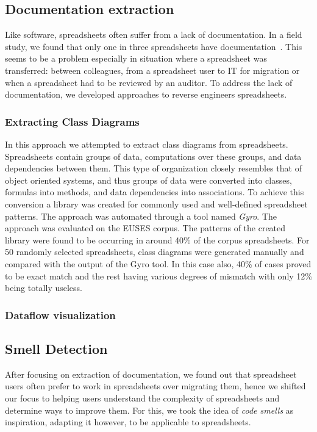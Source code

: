 \documentclass[conference]{IEEEtran}
\begin{document}
\subsection{Documentation extraction} 
Like software, spreadsheets often suffer from a lack of documentation. In a field study, we found that only one in three spreadsheets have documentation~\cite{Hermans2011}. This seems to be a problem especially in situation where a spreadsheet was transferred: between colleagues, from a spreadsheet user to IT for migration or when a spreadsheet had to be reviewed by an auditor. To address the lack of documentation, we developed approaches to reverse engineers spreadsheets.

\subsubsection{Extracting Class Diagrams}
In this approach we attempted to extract class diagrams from spreadsheets. Spreadsheets contain groups of data, computations over these groups, and data dependencies between them. This type of organization closely resembles that of object oriented systems, and thus groups of data were converted into classes, formulas into methods, and data dependencies into associations. To achieve this conversion a library was created for commonly used and well-defined spreadsheet patterns. The approach was automated through a tool named \textit{Gyro}. The approach was evaluated on the EUSES corpus. The patterns of the created library were found to be occurring in around 40\% of the corpus spreadsheets. For 50 randomly selected spreadsheets, class diagrams were generated manually and compared with the output of the Gyro tool. In this case also, 40\% of cases proved to be exact match and the rest having various degrees of mismatch with only 12\% being totally useless.

\subsubsection{Dataflow visualization}

\subsection{Smell Detection} 
After focusing on extraction of documentation, we found out that spreadsheet users often prefer to work in spreadsheets over migrating them, hence we shifted our focus to helping users understand the complexity of spreadsheets and determine ways to improve them. For this, we took the idea of \emph{code smells} as inspiration, adapting it however, to be applicable to spreadsheets.
\end{document}
